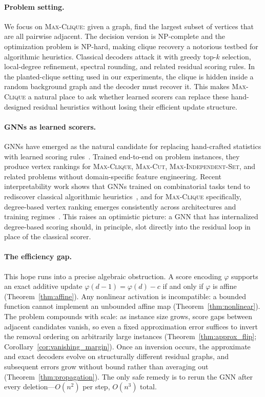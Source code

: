 \documentclass[11pt]{article}
\theoremstyle{plain}
\theoremstyle{remark}
\begin{document}
\paragraph{Problem setting.}
We focus on \textsc{Max-Clique}: given a graph, find the largest subset of vertices
that are all pairwise adjacent. The decision version is NP-complete and the
optimization problem is NP-hard, making clique recovery a notorious testbed for
algorithmic heuristics. Classical decoders attack it with greedy top-$k$ selection,
local-degree refinement, spectral rounding, and related residual scoring rules. In
the planted-clique setting used in our experiments, the clique is hidden inside a
random background graph and the decoder must recover it. This makes
\textsc{Max-Clique} a natural place to ask whether learned scorers can replace these
hand-designed residual heuristics without losing their efficient update structure.

\paragraph{GNNs as learned scorers.}
GNNs have emerged as the natural candidate for replacing hand-crafted statistics
with learned scoring rules~\citep{karalias2020, min2022, garmendia2024}. Trained
end-to-end on problem instances, they produce vertex rankings for \textsc{Max-Clique},
\textsc{Max-Cut}, \textsc{Max-Independent-Set}, and related problems without
domain-specific feature engineering. Recent interpretability work shows that GNNs
trained on combinatorial tasks tend to rediscover classical algorithmic
heuristics~\citep{cappart2023}, and for \textsc{Max-Clique} specifically, degree-based
vertex ranking emerges consistently across architectures and training
regimes~\citep{shoham2026ltr}. This raises an optimistic picture: a GNN that has
internalized degree-based scoring should, in principle, slot directly into the
residual loop in place of the classical scorer.

\paragraph{The efficiency gap.}
This hope runs into a precise algebraic obstruction. A score encoding $\varphi$
supports an exact additive update $\varphi(d-1) = \varphi(d) - c$ if and only if
$\varphi$ is affine (Theorem~\ref{thm:affine}). Any nonlinear activation is
incompatible: a bounded function cannot implement an unbounded affine map
(Theorem~\ref{thm:nonlinear}). The problem compounds with scale: as instance size
grows, score gaps between adjacent candidates vanish, so even a fixed approximation
error suffices to invert the removal ordering on arbitrarily large instances
(Theorem~\ref{thm:approx_flip}; Corollary~\ref{cor:vanishing_margin}). Once an
inversion occurs, the approximate and exact decoders evolve on structurally different
residual graphs, and subsequent errors grow without bound rather than averaging out
(Theorem~\ref{thm:propagation}). The only safe remedy is to rerun the GNN after every
deletion---$O(n^2)$ per step, $O(n^3)$ total.
\end{document}
